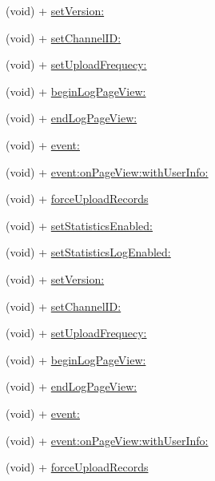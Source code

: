 \begin{DoxyCompactItemize}
\item 
(void) + \mbox{\hyperlink{category_weibo_s_d_k_07_statistics_08_ac68e6c65a10fa6c5f04c1293050a7127}{set\+Version\+:}}
\item 
(void) + \mbox{\hyperlink{category_weibo_s_d_k_07_statistics_08_a8d9fad53942642ec304ecba4734e05c1}{set\+Channel\+I\+D\+:}}
\item 
(void) + \mbox{\hyperlink{category_weibo_s_d_k_07_statistics_08_a6790cf45454697f2b846eb080a130ef2}{set\+Upload\+Frequecy\+:}}
\item 
(void) + \mbox{\hyperlink{category_weibo_s_d_k_07_statistics_08_ae9b18093f71e740c51f254fb517e818d}{begin\+Log\+Page\+View\+:}}
\item 
(void) + \mbox{\hyperlink{category_weibo_s_d_k_07_statistics_08_aa9460b8e4fd90f3b437207c55ef2c40e}{end\+Log\+Page\+View\+:}}
\item 
(void) + \mbox{\hyperlink{category_weibo_s_d_k_07_statistics_08_af035b5557e6dd544e282689323d8c4aa}{event\+:}}
\item 
(void) + \mbox{\hyperlink{category_weibo_s_d_k_07_statistics_08_a7c433640d9ed0d396166f2777a428277}{event\+:on\+Page\+View\+:with\+User\+Info\+:}}
\item 
(void) + \mbox{\hyperlink{category_weibo_s_d_k_07_statistics_08_ab5d6291270ebed0084a505e009bc15a2}{force\+Upload\+Records}}
\item 
(void) + \mbox{\hyperlink{category_weibo_s_d_k_07_statistics_08_a0b32ee3e2b30059b93e7dea204b43818}{set\+Statistics\+Enabled\+:}}
\item 
(void) + \mbox{\hyperlink{category_weibo_s_d_k_07_statistics_08_a2e009db32a6d059ff53e35ac211d57f9}{set\+Statistics\+Log\+Enabled\+:}}
\item 
(void) + \mbox{\hyperlink{category_weibo_s_d_k_07_statistics_08_ac68e6c65a10fa6c5f04c1293050a7127}{set\+Version\+:}}
\item 
(void) + \mbox{\hyperlink{category_weibo_s_d_k_07_statistics_08_a8d9fad53942642ec304ecba4734e05c1}{set\+Channel\+I\+D\+:}}
\item 
(void) + \mbox{\hyperlink{category_weibo_s_d_k_07_statistics_08_a6790cf45454697f2b846eb080a130ef2}{set\+Upload\+Frequecy\+:}}
\item 
(void) + \mbox{\hyperlink{category_weibo_s_d_k_07_statistics_08_ae9b18093f71e740c51f254fb517e818d}{begin\+Log\+Page\+View\+:}}
\item 
(void) + \mbox{\hyperlink{category_weibo_s_d_k_07_statistics_08_aa9460b8e4fd90f3b437207c55ef2c40e}{end\+Log\+Page\+View\+:}}
\item 
(void) + \mbox{\hyperlink{category_weibo_s_d_k_07_statistics_08_af035b5557e6dd544e282689323d8c4aa}{event\+:}}
\item 
(void) + \mbox{\hyperlink{category_weibo_s_d_k_07_statistics_08_a7c433640d9ed0d396166f2777a428277}{event\+:on\+Page\+View\+:with\+User\+Info\+:}}
\item 
(void) + \mbox{\hyperlink{category_weibo_s_d_k_07_statistics_08_ab5d6291270ebed0084a505e009bc15a2}{force\+Upload\+Records}}
\end{DoxyCompactItemize}


